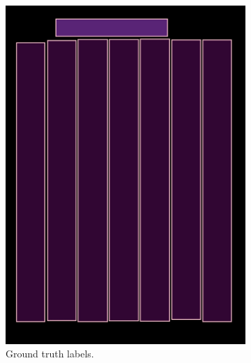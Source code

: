 \documentclass[oneside, english, bibtex]{kththesis}
\begin{document}
\begin{figure}[!htb]
\begin{adjustbox}{center,max size={\textwidth}{0.9\textheight}}
{\begin{subfigure}{0.6\textwidth}
  \includegraphics[width=\linewidth, clip=true, trim = 0mm 0mm 0mm 0mm]{figures/bbox/zk6UnuL.jpg}
  \caption{Ground truth labels.}
  \label{fig:zk6UnuL_GT}
\end{subfigure}
  \centering
\begin{subfigure}{0.6\textwidth}
  \centering

\end{subfigure}}
\end{adjustbox}
\end{figure}
\end{document}
